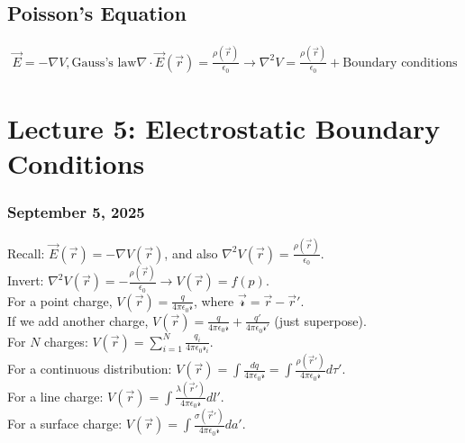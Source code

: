 \documentclass{article}
\begin{document}
\subsection{Poisson's Equation}
\begin{align*}
    \vec{E}=-\nabla V, \text{Gauss's law} \nabla\cdot\vec{E}(\vec{r})=\frac{\rho(\vec{r})}{\epsilon_0} \rightarrow \nabla^2 V = \frac{\rho(\vec{r})}{\epsilon_0} + \text{Boundary conditions}
\end{align*}


\newpage
\section{Lecture 5: Electrostatic Boundary Conditions}
\subsubsection*{September 5, 2025 \\}

Recall: $\vec{E}(\vec{r}) = -\nabla V(\vec{r})$, and also $\nabla^2 V(\vec{r}) = \frac{\rho(\vec{r})}{\epsilon_0}$. \\

Invert: $\nabla^2 V(\vec{r}) = -\frac{\rho(\vec{r})}{\epsilon_0} \rightarrow V(\vec{r}) = f(p)$. \\

For a point charge, $V(\vec{r}) = \frac{q}{4\pi\epsilon_0 \mathcal{r}}$, where $\vec{\mathcal{r}} = \vec{r} - \vec{r}'$. \\

If we add another charge, $V(\vec{r}) = \frac{q}{4\pi\epsilon_0 \mathcal{r}} + \frac{q'}{4\pi\epsilon_0 \mathcal{r}'}$ (just superpose). \\

For $N$ charges: $V(\vec{r}) = \sum_{i=1}^N \frac{q_i}{4\pi\epsilon_0 \mathcal{r}_i}$. \\

For a continuous distribution: $V(\vec{r}) = \int \frac{dq}{4\pi\epsilon_0 \mathcal{r}} = \int \frac{\rho(\vec{r}')}{4\pi\epsilon_0 \mathcal{r}} d\tau'$. \\

For a line charge: $V(\vec{r}) = \int \frac{\lambda(\vec{r}')}{4\pi\epsilon_0 \mathcal{r}} dl'$. \\

For a surface charge: $V(\vec{r}) = \int \frac{\sigma(\vec{r}')}{4\pi\epsilon_0 \mathcal{r}} da'$. \\
\end{document}
